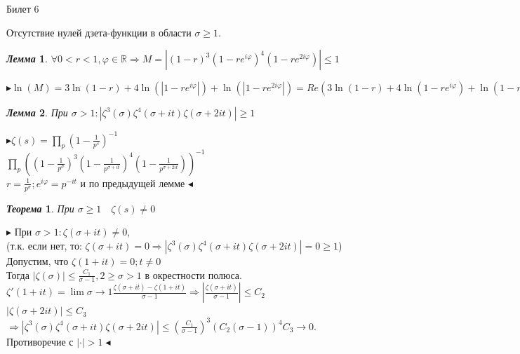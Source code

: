 \documentclass[a4paper,12pt]{article}
\newtheorem{teo}{\textit{Теорема}}
\newtheorem{lem}{\textit{Лемма}}
\newcommand{\q}{\quad}
\newcommand{\pb}{\blacktriangleright}
\newcommand{\pe}{\blacktriangleleft}
\newcommand{\Ra}{\Rightarrow}
\newcommand{\bb}[1]{\mathbb{#1}}
\newcommand{\SL}{\sum\limits}
\newcommand{\os}{\left(}
\newcommand{\cs}{\right)}
\begin{document}
\newpage
\begin{mybox2}{\hypertarget{bil6}{Билет 6}}

\begin{formbox}{}
Отсутствие нулей дзета-функции в области $\sigma \ge 1$.
\end{formbox}
\begin{formbox}{}
\begin{lem} $\forall 0 < r < 1, \varphi\in \bb{R} \Ra M = \left| (1-r)^3(1-re^{i\varphi})^4 (1 - re^{2i\varphi}) \right| \le 1 $
\end{lem}
\end{formbox}
$\pb \ln(M) = 3\ln(1-r) + 4\ln(|1-re^{i\varphi}|) + \ln(|1 - re^{2i\varphi}|) = Re(3\ln(1-r) + 4\ln(1-re^{i\varphi}) + \ln(1 - re^{2i\varphi})) = -\SL_{n=1}^\infty \frac{r^n}{n}Re(3+4e^{in\varphi} + e^{2in\varphi}) = \SL_{n=1}^\infty \frac{r^n}{n} (3 + 4\cos(n\varphi) + \cos(2n\varphi)) = -2\SL_{n=1}^\infty \frac{r^n}{n} (\cos(n\varphi) + 1)^2 \pe  $\\

\begin{formbox}{}
\begin{lem} При $\sigma > 1: |\zeta^3(\sigma)\zeta^4(\sigma+it)\zeta(\sigma+2it)| \ge 1$
\end{lem}
\end{formbox}
$\pb\zeta(s) = \prod\limits_p \os 1 - \frac{1}{p^s} \cs ^{-1}$\\
$\prod\limits_p \os \os 1 - \frac{1}{p^\sigma} \cs^3 \os 1 - \frac{1}{p^{\sigma+it}} \cs^4 \os 1 - \frac{1}{p^{\sigma+2it}} \cs \cs^{-1}$\\
$r = \frac{1}{p^\sigma}; e^{i\varphi} = p^{-it}$ и по предыдущей лемме $\pe$



\begin{formbox}{}
\begin{teo} При $\sigma \ge 1 \q \zeta(s) \not= 0$
\end{teo}
\end{formbox}
$\pb$
При $\sigma > 1: \zeta(\sigma+it)\not=0$, \\(т.к. если нет, то: $\zeta(\sigma+it)=0\Ra |\zeta^3(\sigma)\zeta^4(\sigma + it)\zeta(\sigma + 2it)| = 0 \ge 1$)\\
Допустим, что $\zeta(1+it) = 0; t\not=0$\\
Тогда $|\zeta(\sigma)| \le \frac{C_1}{\sigma-1}, 2 \ge \sigma > 1 $ в окрестности полюса.\\
$\zeta'(1+it) = \lim\limits{\sigma\to1}\frac{\zeta(\sigma+it) - \zeta(1+it)}{\sigma-1}\Ra \left|\frac{\zeta(\sigma+it)}{\sigma-1}\right| \le C_2$\\
$|\zeta(\sigma+2it)| \le C_3$\\
$\Ra |\zeta^3(\sigma) \zeta^4(\sigma+it)\zeta(\sigma+2it)| \le \os \frac{C_1}{\sigma-1} \cs^3 (C_2(\sigma-1))^4 C_3 \to 0$. \\Противоречие с $|\cdot| > 1\pe$
\end{mybox2}
\end{document}
